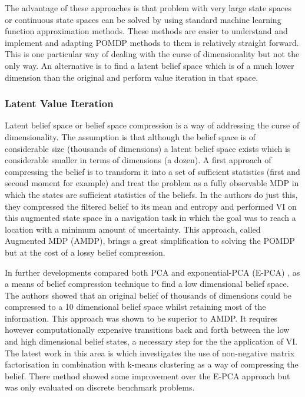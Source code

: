 The advantage of these approaches is that problem with very large state spaces or continuous state spaces can be solved by using
standard machine learning function approximation methods. These methods are easier to understand and implement and adapting 
POMDP methods to them is relatively straight forward. This is one particular way of dealing with the curse of dimensionality but not the 
only way. An alternative is to find a latent belief space which is of a much lower dimension than the original and perform value iteration in 
that space.

\subsubsection{Latent Value Iteration}

Latent belief space or belief space compression is a way of addressing the curse of dimensionality. The assumption 
is that although the belief space is of considerable size (thousands of dimensions) a latent belief space exists 
which is considerable smaller in terms of dimensions (a dozen).
A first approach of compressing the belief is to transform it into a set of sufficient statistics (first and second moment for example) and  
treat the problem as a fully observable MDP in which the states are sufficient statistics of the beliefs. 
In \cite{Roy99coastalnavigation} the authors do just this, they compressed the filtered belief to its mean and entropy and performed VI on 
this augmented state space in a navigation task in which the goal was to reach a location with a minimum amount of uncertainty. This approach,
called Augmented MDP (AMDP), brings a great simplification to solving the POMDP but at the cost of a lossy belief compression. 

In further developments \cite{belief_compression_2005} compared both PCA and exponential-PCA (E-PCA) \cite{EPCA_2003}, as a means of belief compression technique
to find a low dimensional belief space. The authors showed that an original belief of thousands of dimensions could be compressed 
to a 10 dimensional belief space whilst retaining most of the information. This approach was shown to be superior to AMDP. It requires however 
computationally expensive transitions back and forth between the low and high dimensional belief states, a necessary step for the the application of VI. The latest work in this 
area is \cite{bs_compression_2010} which investigates the use of non-negative matrix factorisation in combination with k-means 
clustering as a way of compressing the belief. There method showed some improvement over the E-PCA approach but was only evaluated 
on discrete benchmark problems.


